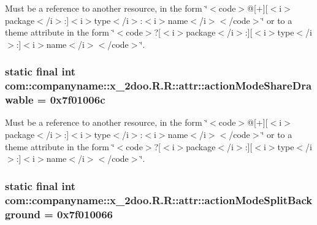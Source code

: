 Must be a reference to another resource, in the form \char`\"{}$<$code$>$@\mbox{[}+\mbox{]}\mbox{[}$<$i$>$package$<$/i$>$:\mbox{]}$<$i$>$type$<$/i$>$:$<$i$>$name$<$/i$>$$<$/code$>$\char`\"{} or to a theme attribute in the form \char`\"{}$<$code$>$?\mbox{[}$<$i$>$package$<$/i$>$:\mbox{]}\mbox{[}$<$i$>$type$<$/i$>$:\mbox{]}$<$i$>$name$<$/i$>$$<$/code$>$\char`\"{}. \hypertarget{classcom_1_1companyname_1_1x__2doo_1_1_r_1_1attr_5cba5b5e90ccae3d08eaea7f5b1159ac}{
\subsubsection[{actionModeShareDrawable}]{\setlength{\rightskip}{0pt plus 5cm}static final int com::companyname::x\_\-2doo.R.R::attr::actionModeShareDrawable = 0x7f01006c}}
\label{classcom_1_1companyname_1_1x__2doo_1_1_r_1_1attr_5cba5b5e90ccae3d08eaea7f5b1159ac}


Must be a reference to another resource, in the form \char`\"{}$<$code$>$@\mbox{[}+\mbox{]}\mbox{[}$<$i$>$package$<$/i$>$:\mbox{]}$<$i$>$type$<$/i$>$:$<$i$>$name$<$/i$>$$<$/code$>$\char`\"{} or to a theme attribute in the form \char`\"{}$<$code$>$?\mbox{[}$<$i$>$package$<$/i$>$:\mbox{]}\mbox{[}$<$i$>$type$<$/i$>$:\mbox{]}$<$i$>$name$<$/i$>$$<$/code$>$\char`\"{}. \hypertarget{classcom_1_1companyname_1_1x__2doo_1_1_r_1_1attr_8aeadb6b575c0d3036eb01011133a4fc}{
\subsubsection[{actionModeSplitBackground}]{\setlength{\rightskip}{0pt plus 5cm}static final int com::companyname::x\_\-2doo.R.R::attr::actionModeSplitBackground = 0x7f010066}}
\label{classcom_1_1companyname_1_1x__2doo_1_1_r_1_1attr_8aeadb6b575c0d3036eb01011133a4fc}


